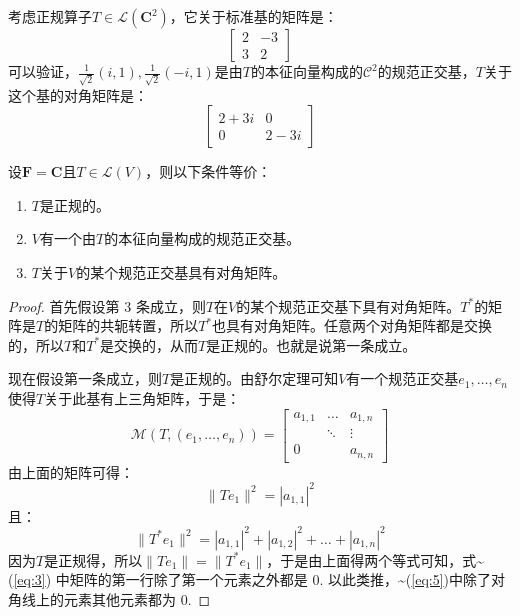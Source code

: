\documentclass[10pt,a4paper,UTF8]{article}
\begin{document}
\begin{tikzinstance}
考虑正规算子\(T\in \mathcal{L}(\mathbf{C}^{2})\)，它关于标准基的矩阵是：
\begin{equation}
\label{eq:1}
\begin{bmatrix}
  2& -3 \\
  3& 2
\end{bmatrix}
\end{equation}
可以验证，\(\tfrac{1}{\sqrt{2}}(i,1), \tfrac{1}{\sqrt{2}}(-i,1)\)是由\(T\)的本征向量构成的\(\mathcal{C}^{2}\)的规范正交基，\(T\)关于这个基的对角矩阵是：
\begin{equation}
\label{eq:2}
\begin{bmatrix}
  2+3i & 0 \\
  0 & 2-3i
\end{bmatrix}
\end{equation}
\end{tikzinstance}

\begin{tikztheorem}
设\(\mathbf{F}=\mathbf{C}\)且\(T\in \mathcal{L}(V)\)，则以下条件等价：
\begin{enumerate}
\item \(T\)是正规的。
\item \(V\)有一个由\(T\)的本征向量构成的规范正交基。
\item \(T\)关于\(V\)的某个规范正交基具有对角矩阵。
\end{enumerate}
\end{tikztheorem}
\begin{proof}
首先假设第 3 条成立，则\(T\)在\(V\)的某个规范正交基下具有对角矩阵。\(T^{*}\)的矩阵是\(T\)的矩阵的共轭转置，所以\(T^{*}\)也具有对角矩阵。任意两个对角矩阵都是交换的，所以\(T\)和\(T^{*}\)是交换的，从而\(T\)是正规的。也就是说第一条成立。

现在假设第一条成立，则\(T\)是正规的。由舒尔定理可知\(V\)有一个规范正交基\(e_{1},\ldots ,e_{n}\)使得\(T\)关于此基有上三角矩阵，于是：
\begin{equation}
\label{eq:3}
\mathcal{M}(T,(e_{1},\ldots ,e_{n})) =
\begin{bmatrix}
  a_{1,1} & \ldots & a_{1,n} \\
          & \ddots & \vdots  \\
    0     &        & a_{n,n}
\end{bmatrix}
\end{equation}
由上面的矩阵可得：
\begin{equation}
\label{eq:4}
\| Te_{1} \| ^{2} = |a_{1,1}|^{2}
\end{equation}
且：
\begin{equation}
\label{eq:5}
\| T^{*} e_{1} \|^{2} = |a_{1,1}|^{2} + |a_{1,2}|^{2} + \ldots + |a_{1,n}|^{2}
\end{equation}
因为\(T\)是正规得，所以\(\|Te_{1}\| = \|T^{*}e_{1}\|\)，于是由上面得两个等式可知，式\textasciitilde{}(\ref{eq:3}) 中矩阵的第一行除了第一个元素之外都是 0. 以此类推，\textasciitilde{}(\ref{eq:5})中除了对角线上的元素其他元素都为 0.
\end{proof}
\end{document}
